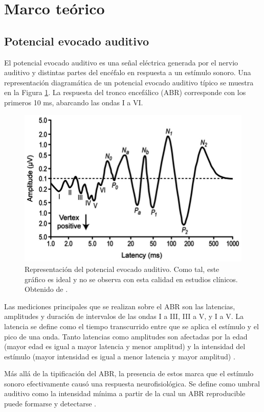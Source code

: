 \section{Marco teórico} \label{marco_teorico}

\subsection{Potencial evocado auditivo}

El potencial evocado auditivo es una señal eléctrica generada por el nervio auditivo y distintas partes del encéfalo en respuesta a un estímulo sonoro. Una representación diagramática de un potencial evocado auditivo típico se muestra en la Figura \ref{fig:AEP}. La respuesta del tronco encefálico (ABR) corresponde con los primeros 10 ms, abarcando las ondas I a VI.

\begin{figure}[H]
    \centering
    \includegraphics[width=0.8\linewidth]{figuras/AEP.png}
    \caption{Representación del potencial evocado auditivo. Como tal, este gráfico es ideal y no se observa con esta calidad en estudios clínicos. Obtenido de \cite{perez-gonzales-2014}.}
    \label{fig:AEP}
\end{figure}

Las mediciones principales que se realizan sobre el ABR son las latencias, amplitudes y duración de intervalos de las ondas I a III, III a V, y I a V. La latencia se define como el tiempo transcurrido entre que se aplica el estímulo y el pico de una onda. Tanto latencias como amplitudes son afectadas por la edad (mayor edad es igual a mayor latencia y menor amplitud) y la intensidad del estímulo (mayor intensidad es igual a menor latencia y mayor amplitud) \cite{young-ABR}.

Más allá de la tipificación del ABR, la presencia de estos marca que el estímulo sonoro efectivamente causó una respuesta neurofisiológica. Se define como umbral auditivo como la intensidad mínima a partir de la cual un ABR reproducible puede formarse y detectarse \cite{sininger-1993-ABR}.

